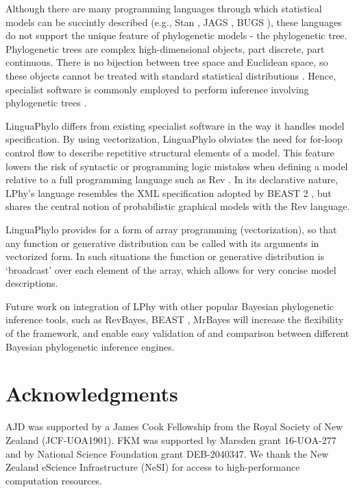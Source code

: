 \documentclass[10pt,letterpaper,table]{article}
\theoremstyle{definition}
\begin{document}
Although there are many
programming languages through which statistical 
models can be succintly described (e.g., Stan
\cite{carpenter2017stan}, JAGS \cite{plummer2003jags}, BUGS
\cite{lunn2009bugs, gilks1994language}), these languages do not
support the unique feature of phylogenetic models - the phylogenetic
tree.
Phylogenetic trees are complex high-dimensional objects, part
discrete, part continuous.
There is no bijection between tree space and Euclidean space, so these
objects cannot be treated with standard statistical distributions \cite{gavryushkin2016space}.
Hence, specialist software is commonly employed to perform inference
involving phylogenetic trees
\cite{hohna2016revbayes,bouckaert2019beastanalysis}.

LinguaPhylo differs from existing specialist software in the way it handles model specification.
By using vectorization, LinguaPhylo obviates the need for for-loop control flow to describe repetitive structural elements of a model.
This feature lowers the risk of syntactic or programming logic mistakes when defining a model relative to a full programming language such as Rev \cite{revbayes}.
In its declarative nature, LPhy's language resembles the XML specification adopted by BEAST 2 \cite{bouckaert2014beast}, but shares the central notion of probabilistic graphical models with the Rev language.

LinguaPhylo provides for a form of array programming (vectorization), so that any function or
generative distribution can be called with its arguments in
vectorized form. In such situations the function or generative distribution is `broadcast' over each element of the array, which allows for very concise model descriptions.

Future work on integration of LPhy with other popular Bayesian phylogenetic inference tools, such as RevBayes\cite{hohna2016revbayes}, BEAST \cite{suchard2018bayesian}, MrBayes\cite{ronquist2012mrbayes} will increase the flexibility of the framework, and enable easy validation of and comparison between different Bayesian phylogenetic inference engines.

\section*{Acknowledgments}
AJD was supported by a James Cook Fellowship from the Royal Society of New Zealand (JCF-UOA1901). FKM was supported by Marsden grant 16-UOA-277 and by National Science Foundation grant DEB-2040347. We thank the New Zealand eScience Infrastructure (NeSI) for access to high-performance computation resources.
\end{document}
